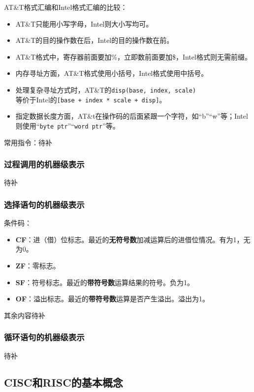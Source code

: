 \documentclass[12pt, a4paper, oneside]{ctexart}
\begin{document}
AT\&T格式汇编和Intel格式汇编的比较：
\begin{itemize}
  \item AT\&T只能用小写字母，Intel则大小写均可。
  \item AT\&T的目的操作数在后，Intel的目的操作数在前。
  \item AT\&T格式中，寄存器前面要加\%，立即数前面要加\$，Intel格式则无需前缀。
  \item 内存寻址方面，AT\&T格式使用小括号，Intel格式使用中括号。
  \item 处理复杂寻址方式时，AT\&T的\verb|disp(base, index, scale)|\\ 等价于Intel的\verb|[base + index * scale + disp]|。
  \item 指定数据长度方面，AT\&t在操作码的后面紧跟一个字符，如“b”“w”等；Intel则使用“\verb|byte ptr|”“\verb|word ptr|”等。
\end{itemize}

常用指令：待补

\subsubsection{过程调用的机器级表示}

待补

\subsubsection{选择语句的机器级表示}

条件码：
\begin{itemize}
  \item {\bf CF}：进（借）位标志。最近的\textbf{无符号数}加减运算后的进借位情况。有为1，无为0。
  \item {\bf ZF}：零标志。
  \item {\bf SF}：符号标志。最近的\textbf{带符号数}运算结果的符号。负为1。
  \item {\bf OF}：溢出标志。最近的\textbf{带符号数}运算是否产生溢出。溢出为1。
\end{itemize}

其余内容待补

\subsubsection{循环语句的机器级表示}

待补

\subsection{CISC和RISC的基本概念}
\end{document}
